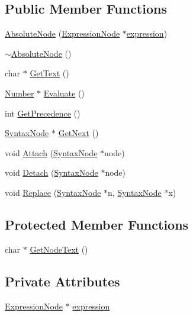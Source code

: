 \subsection*{Public Member Functions}
\begin{DoxyCompactItemize}
\item 
\hyperlink{classAbsoluteNode_af1206a7293f334c1d544cafe95af3ba5}{Absolute\+Node} (\hyperlink{classExpressionNode}{Expression\+Node} $\ast$\hyperlink{classAbsoluteNode_a1b1bea1b153597964e64c7e15f0aa9e1}{expression})
\item 
\hyperlink{classAbsoluteNode_ac4805b3b37437bb1fd4acb14eb4eeced}{$\sim$\+Absolute\+Node} ()
\item 
char $\ast$ \hyperlink{classAbsoluteNode_ada1094b5e5ed6033f193ac151058c364}{Get\+Text} ()
\item 
\hyperlink{structNumber}{Number} $\ast$ \hyperlink{classAbsoluteNode_a35e012fdac8bff4c5252021254f07cbe}{Evaluate} ()
\item 
int \hyperlink{classAbsoluteNode_a6fb0f08b41c558e8746b24fa79552545}{Get\+Precedence} ()
\item 
\hyperlink{classSyntaxNode}{Syntax\+Node} $\ast$ \hyperlink{classAbsoluteNode_adcc7a1dd7bd20d811c5b9ac8d9e5efb1}{Get\+Next} ()
\item 
void \hyperlink{classAbsoluteNode_a4f947588881076306bf79f69145713b7}{Attach} (\hyperlink{classSyntaxNode}{Syntax\+Node} $\ast$node)
\item 
void \hyperlink{classAbsoluteNode_a5bf1491e1f71c87b38360e0d9231ac11}{Detach} (\hyperlink{classSyntaxNode}{Syntax\+Node} $\ast$node)
\item 
void \hyperlink{classAbsoluteNode_a675d28427432b9947af9441c3bcf5401}{Replace} (\hyperlink{classSyntaxNode}{Syntax\+Node} $\ast$n, \hyperlink{classSyntaxNode}{Syntax\+Node} $\ast$x)
\end{DoxyCompactItemize}
\subsection*{Protected Member Functions}
\begin{DoxyCompactItemize}
\item 
char $\ast$ \hyperlink{classAbsoluteNode_ae5e2148cb9fedaee9137d3c124399c76}{Get\+Node\+Text} ()
\end{DoxyCompactItemize}
\subsection*{Private Attributes}
\begin{DoxyCompactItemize}
\item 
\hyperlink{classExpressionNode}{Expression\+Node} $\ast$ \hyperlink{classAbsoluteNode_a1b1bea1b153597964e64c7e15f0aa9e1}{expression}
\end{DoxyCompactItemize}
